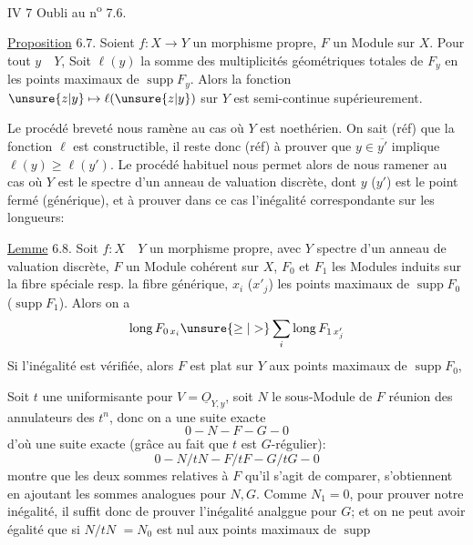 IV 7 Oubli au n\textsuperscript{o} 7.6.

\uline{Proposition} 6.7. Soient $f:X\longrightarrow Y$ un morphisme
  propre,
$F$ un Module  
sur $X$.  Pour tout $y\quad Y$,
Soit $\ell(y)$ la somme des  multiplicités 
géométriques totales  de
$F_y$ en les points maximaux de $\operatorname{supp}F_y$.
Alors la fonction $\unsure{z|y}\mapsto\ell(\unsure{z|y})$ sur
$Y$ est semi-continue supérieurement.

Le procédé breveté nous ramène au cas où $Y$ est noethérien. On sait
(réf) que la fonction $\ell$ est constructible, il reste donc (réf) à prouver
que $y\in\overline{y'}$ implique $\ell(y)\geq\ell(y')$. Le procédé habituel nous permet
alors de nous ramener au cas où $Y$ est le spectre d'un anneau de valuation
discrète, dont $y$ ($y'$) est le point fermé (générique), et 
à prouver dans ce cas l'inégalité correspondante sur les longueurs:

\uline{Lemme} 6.8. Soit $f:X\quad Y$ un morphisme propre, avec $Y$ spectre d'un anneau
de valuation discrète, $F$ un Module cohérent sur $X$, 
$F_0$ et $F_1$ les 
Modules induits sur la fibre spéciale resp. la fibre générique, $x_i$
($x'_j$) les points maximaux de $\operatorname{supp}F_0$ ($\operatorname{supp}F_1$).
Alors on a
\[
\operatorname{long} F_{0\,x_i}\unsure{\geq|>}\sum_i\operatorname{long}F_{1\,x'_j}
\]
Si l'inégalité est vérifiée, alors $F$ est plat sur $Y$ aux points 
maximaux de $\operatorname{supp}F_0$, 

Soit $t$ une uniformisante pour $V=\underline O_{Y,y}$, soit $N$ le sous-Module
de $F$ réunion des annulateurs des $t^n$, donc on a une suite exacte
\[
0\mathrel{-}N\mathrel{-}F\mathrel{-}G\mathrel{-}0
\]
d'où une suite exacte (grâce au fait que $t$ est $G$-régulier):
\[
0\mathrel{-}N/tN\mathrel{-}F/tF\mathrel{-}G/tG\mathrel{-}0
\]
 montre que les deux sommes  relatives à $F$ qu'il s'agit de
comparer, s'obtiennent en ajoutant les sommes analogues pour $N,G$.
Comme $N_1=0$, pour prouver notre inégalité, il suffit donc de
prouver l'inégalité analggue pour $G$; et on ne peut avoir égalité
que si $N/tN$  $=N_0$ est nul aux points maximaux de $\operatorname{supp}$
\unsure{$\cdots$}

